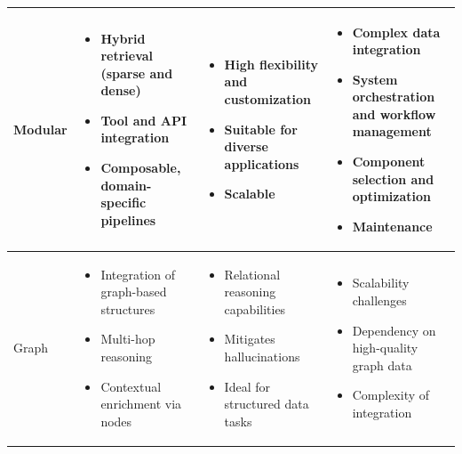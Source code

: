 \begin{table}[htbp]
\begin{tabularx}{\textwidth}{|>{\centering\arraybackslash}p{1.5cm}|X|X|X|}
      \hline
      \begin{center}
        Modular
      \end{center} & \begin{itemize}[nosep, left=0pt]
        \item Hybrid retrieval (sparse and dense)
        \item Tool and API integration
        \item Composable, domain-specific pipelines
      \end{itemize} & \begin{itemize}[nosep, left=0pt]
        \item High flexibility and customization
        \item Suitable for diverse applications
        \item Scalable
      \end{itemize} & \begin{itemize}[nosep, left=0pt]
        \item Complex data integration
        \item System orchestration and workflow management
        \item Component selection and optimization
        \item Maintenance
      \end{itemize}\\
      \hline
      \begin{center}
        Graph
      \end{center} & \begin{itemize}[nosep, left=0pt]
        \item Integration of graph-based structures
        \item Multi-hop reasoning
        \item Contextual enrichment via nodes
      \end{itemize}& \begin{itemize}[nosep, left=0pt]
        \item Relational reasoning capabilities
        \item Mitigates hallucinations
        \item Ideal for structured data tasks
      \end{itemize}& \begin{itemize}[nosep, left=0pt]
        \item Scalability challenges
        \item Dependency on high-quality graph data
        \item Complexity of integration

\end{itemize}
\end{tabularx}
\end{table}
